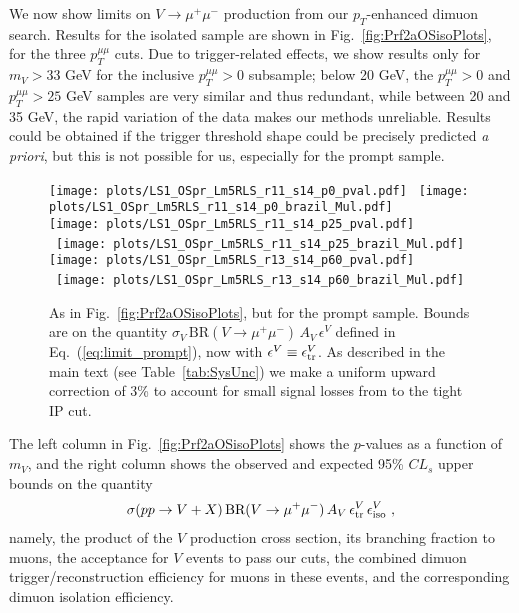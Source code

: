 \documentclass[aps,prd,twocolumn,superscriptaddress,preprintnumbers,nofootinbib,longbibliography,floatfix]{revtex4-1}
\newcommand{\nameofsearch}{$p_T$-enhanced }
\newcommand{\ptmm}{p_T^{\mu\mu}}
\newcommand{\BR}{\text{BR}}
\DeclareRobustCommand{\Tab}[1]{Table~\ref{#1}}
\DeclareRobustCommand{\Fig}[1]{Fig.~\ref{#1}}
\DeclareRobustCommand{\Eq}[1]{Eq.~(\ref{#1})}
\begin{document}
We now show limits on $V \to \mu^+ \mu^-$ production from our \nameofsearch dimuon search.
%
Results for the isolated sample are shown in \Fig{fig:Prf2aOSisoPlots}, for the three $\ptmm$ cuts.
%
Due to trigger-related effects, we show results only for $m_V>33$ GeV  for the inclusive $\ptmm>0$ subsample; below 20 GeV, the $\ptmm>0$ and $\ptmm>25$ GeV samples are very similar and thus redundant, while between 20 and 35 GeV, the rapid variation of the data makes our methods unreliable.
%
Results could be obtained if the trigger threshold shape could be precisely predicted {\it a priori}, but this is not possible for us, especially for the prompt sample.


%
\begin{figure*}[t]  
\begin{center}  
\leavevmode
\vskip 0.0in
\texttt{[image: plots/LS1\_OSpr\_Lm5RLS\_r11\_s14\_p0\_pval.pdf]} \
\texttt{[image: plots/LS1\_OSpr\_Lm5RLS\_r11\_s14\_p0\_brazil\_Mul.pdf]} \\
\texttt{[image: plots/LS1\_OSpr\_Lm5RLS\_r11\_s14\_p25\_pval.pdf]} \
\texttt{[image: plots/LS1\_OSpr\_Lm5RLS\_r11\_s14\_p25\_brazil\_Mul.pdf]} \\
\texttt{[image: plots/LS1\_OSpr\_Lm5RLS\_r13\_s14\_p60\_pval.pdf]} \
\texttt{[image: plots/LS1\_OSpr\_Lm5RLS\_r13\_s14\_p60\_brazil\_Mul.pdf]} \\
\end{center}
\vskip -0.20in  
\caption{As in \Fig{fig:Prf2aOSisoPlots}, but for the prompt sample.
%
Bounds are on the quantity $\sigma_V \, \BR (V\to\mu^+\mu^-) \, A_V \, \epsilon^V$ defined in  \Eq{eq:limit_prompt}, now with $\epsilon^V \equiv \epsilon^V_{\rm tr}$.
%
As described in the main text (see \Tab{tab:SysUnc}) we make a uniform upward correction of 3\% to account for small signal losses from to the tight IP cut.}  
\label{fig:Prf2aOSprPlots}
\end{figure*}



The left column in \Fig{fig:Prf2aOSisoPlots} shows the $p$-values as a function of $m_{V}$, and the right column shows the observed and expected 95\% $CL_s$ upper bounds on the quantity
%
\begin{align}
\label{eq:limit_iso}
	\sigma(pp\to V+X) \, \BR (V\to\mu^+\mu^-) \, A_V \, \epsilon^V_{\rm tr} \, \epsilon^V_{\rm iso} \ , 
\end{align}
%
namely, the product of the $V$ production cross section, its branching fraction to muons, the acceptance for $V$ events to pass our cuts, the combined dimuon trigger/reconstruction efficiency for muons in these events, and the corresponding dimuon isolation efficiency.
%
\end{document}
